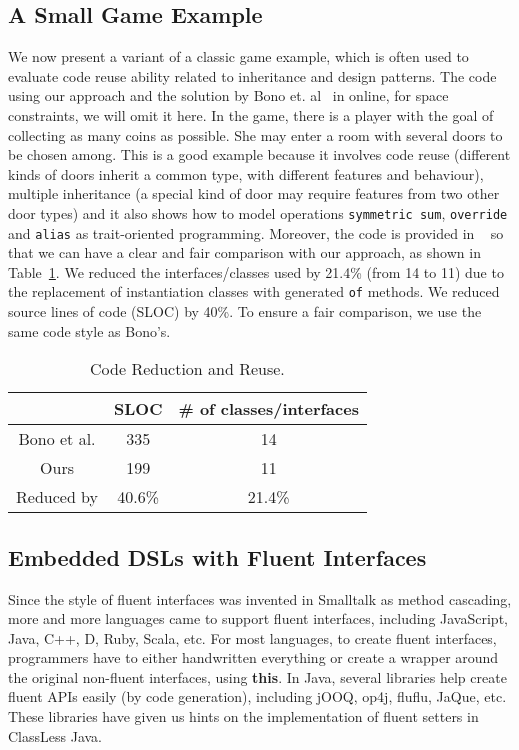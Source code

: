 \subsection{A Small Game Example}
We now present a variant of a classic game example, which is often used to
evaluate code reuse ability related to inheritance and design patterns. The code
using our approach and the solution by Bono et. al~\cite{bono14} in online, for
space constraints, we will omit it here. In the game, there is a player with the
goal of collecting as many coins as possible. She may enter a room with several
doors to be chosen among. This is a good example because it involves code reuse
(different kinds of doors inherit a common type, with different features and
behaviour), multiple inheritance (a special kind of door may require features
from two other door types) and it also shows how to model operations
\texttt{symmetric sum}, \texttt{override} and \texttt{alias} as trait-oriented
programming. Moreover, the code is provided in ~\cite{bono14} so that we can
have a clear and fair comparison with our approach, as shown in
Table~\ref{table:codereduction}. We reduced the interfaces/classes used by
21.4\% (from 14 to 11) due to the replacement of instantiation classes with
generated \texttt{of} methods. We reduced source lines of code (SLOC) by
40\%. To ensure a fair comparison, we use the same code style as Bono's.

\begin{table}[h]
\centering
\begin{tabular}{ccc}
\hline
            & SLOC   & \# of classes/interfaces \\ \hline
Bono et al. & 335    & 14                       \\
Ours        & 199    & 11                       \\
\rowcolor[HTML]{C0C0C0} 
Reduced by  & 40.6\% & 21.4\%                   \\ \hline
\end{tabular}
\caption{Code Reduction and Reuse.}
\label{table:codereduction}
\end{table}


\subsection{Embedded DSLs with Fluent Interfaces}
Since the style of fluent interfaces was invented in Smalltalk as method
cascading, more and more languages came to support fluent interfaces, including
JavaScript, Java, C++, D, Ruby, Scala, etc. For most languages, to create fluent
interfaces, programmers have to either handwritten everything or create a
wrapper around the original non-fluent interfaces, using \textbf{this}. In Java,
several libraries help create fluent APIs easily (by code generation), including
jOOQ, op4j, fluflu, JaQue, etc. These libraries have given us hints on the
implementation of fluent setters in ClassLess Java.

